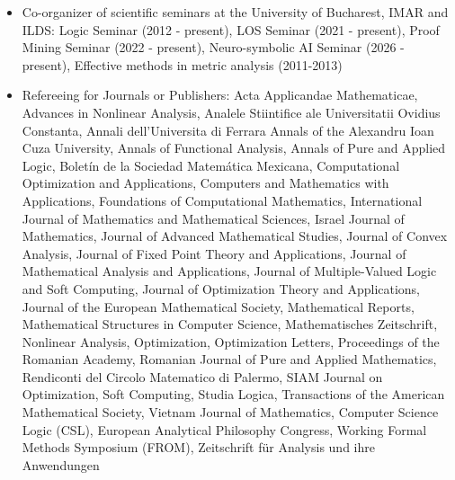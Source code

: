 \documentclass[12pt]{article}
\begin{document}
\begin{itemize}
\begin{itemize}
\item The international workshop on Graphs, Networks and Digital Humanities, Buch-arest, Romania, October 9-11, 2017
\item Fuzzy Logic meets Quantum Logic: The first joint Bucharest - Cagliari Logical Meeting (BuCaL2017),  Bucharest, Romania, September 25-26, 2017
\item Special Session: Logic in Computer Science, The Eighth Congress of Romanian Mathematicians,  Ia\c{s}i, Romania, June 26 - July 1, 2014
\item Algebra and Probability in Many-Valued Logics, International Workshop on Logical and Algebraic aspects of Many-Valued Reasoning, Darmstadt, Germany, May 14-16, 2009
\end{itemize}
\item Co-organizer of  scientific seminars at the University of Bucharest, IMAR and ILDS:  Logic Seminar (2012 -  present),  LOS Seminar (2021 - present), Proof Mining Seminar  (2022 - present), Neuro-symbolic AI Seminar (2026 - present), 
Effective methods in metric analysis (2011-2013)
\item Refereeing for Journals or Publishers: 
Acta Applicandae Mathematicae, 
Advances in Nonlinear Analysis,
Analele Stiintifice ale Universitatii Ovidius Constanta,  
Annali dell'Universita di Ferrara
Annals of the Alexandru Ioan Cuza University, 
Annals of Functional Analysis, 
Annals of Pure and Applied Logic, 
Bolet\' in de la Sociedad Matem\' atica Mexicana,
Computational Optimization and Applications, 
Computers and Mathematics with Applications, 
Foundations of Computational Mathematics,
International Journal of Mathematics and Mathematical Sciences, 
Israel Journal of Mathematics,
Journal of Advanced Mathematical Studies,
Journal of Convex Analysis,
Journal of Fixed Point Theory and Applications,
Journal of Mathematical Analysis and Applications, 
Journal of Multiple-Valued Logic and Soft Computing, 
Journal of Optimization Theory and Applications,
Journal of the European Mathematical Society,
Mathematical Reports, 
Mathematical Structures in Computer Science,
Mathematisches Zeitschrift, 
Nonlinear Analysis, 
Optimization,
Optimization Letters, 
Proceedings of the Romanian Academy, 
Romanian Journal of Pure and Applied Mathematics, 
Rendiconti del Circolo Matematico di Palermo, 
SIAM Journal on Optimization,
Soft Computing, 
Studia Logica, 
Transactions of the American Mathematical Society,
Vietnam Journal of Mathematics, 
Computer Science Logic (CSL),
European Analytical Philosophy Congress,
Working Formal Methods Symposium (FROM),
Zeitschrift für Analysis und ihre Anwendungen
\end{itemize}
\end{document}

